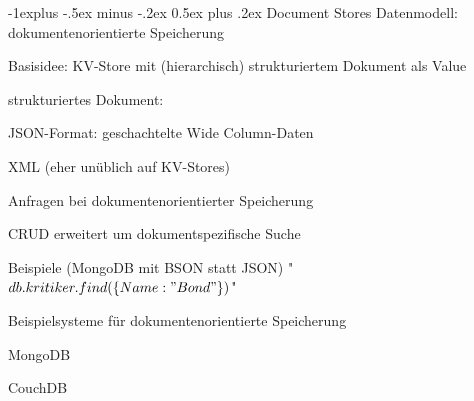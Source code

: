 \documentclass[a4paper]{article}
\makeatletter
\renewcommand{\subsection}{\@startsection{subsection}{2}{0mm}%
                                {-1explus -.5ex minus -.2ex}%
                                {0.5ex plus .2ex}%
                                {\normalfont\normalsize\bfseries}}
\makeatother
\begin{document}
\begin{multicols}{3}
\begin{itemize*}
    \subsection{Document Stores}
    Datenmodell: dokumentenorientierte Speicherung
    \begin{itemize*}
        \item Basisidee: KV-Store mit (hierarchisch) strukturiertem Dokument als Value
        \item strukturiertes Dokument:
        \begin{itemize*}
            \item JSON-Format: geschachtelte Wide Column-Daten
            \item XML (eher unüblich auf KV-Stores)
        \end{itemize*}
        \item Anfragen bei dokumentenorientierter Speicherung
        \begin{itemize*}
            \item CRUD erweitert um dokumentspezifische Suche
            \item Beispiele (MongoDB mit BSON statt JSON) "$db.kritiker.find(\{Name: "Bond"\})$"
        \end{itemize*}
        \item Beispielsysteme für dokumentenorientierte Speicherung
        \begin{itemize*}
            \item MongoDB
            \item CouchDB
        \end{itemize*}
    \end{itemize*}


\end{itemize*}
\end{multicols}
\end{document}
